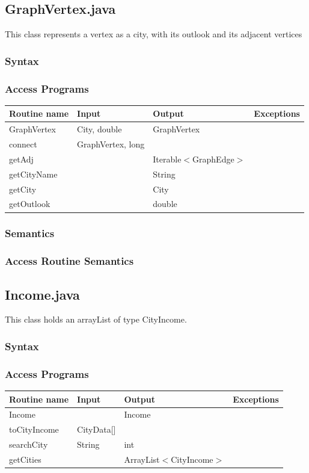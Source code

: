\documentclass[12pt,fleqn]{article}
\begin{document}

\subsection*{GraphVertex.java}\label{vertex}
This class represents a vertex as a city, with its outlook and its adjacent vertices
\subsubsection* {Syntax}

\subsubsection* {Access Programs}
\begin{tabular}{| l | l | l | l |}
\hline
\textbf{Routine name} & \textbf{Input} & \textbf{Output} & \textbf{Exceptions}\\
\hline
GraphVertex & City, double & GraphVertex & ~\\
\hline
connect & GraphVertex, long & ~ & ~\\
\hline
getAdj & ~ & Iterable$<$GraphEdge$>$ & ~\\
\hline
getCityName & ~ & String & ~\\
\hline
getCity & ~ & City & ~\\
\hline
getOutlook & ~ & double & ~\\
\hline
\end{tabular}

\subsubsection*{Semantics}
\subsubsection*{Access Routine Semantics}


\subsection*{Income.java}\label{income}
This class holds an arrayList of type CityIncome.
\subsubsection* {Syntax}

\subsubsection* {Access Programs}
\begin{tabular}{| l | l | l | l |}
\hline
\textbf{Routine name} & \textbf{Input} & \textbf{Output} & \textbf{Exceptions}\\
\hline
Income & ~ & Income& ~\\
\hline
toCityIncome & CityData[] & ~ & ~\\
\hline
searchCity & String & int & ~\\
\hline
getCities & ~ & ArrayList$<$CityIncome$>$ & ~\\
\hline
\end{tabular}
\end{document}
